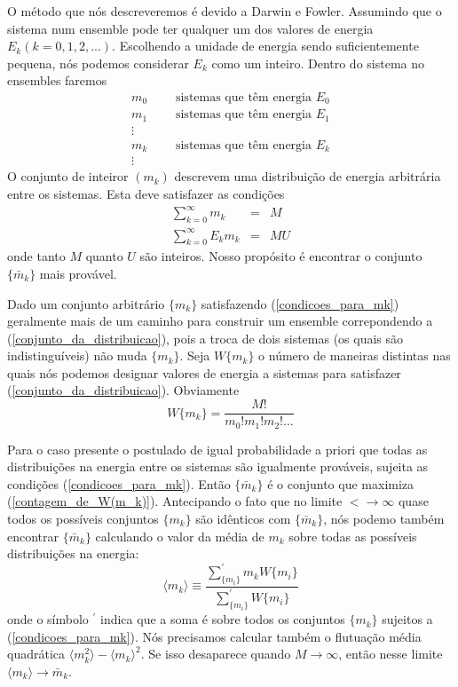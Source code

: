 O método que nós descreveremos é devido a Darwin e Fowler. Assumindo que o sistema num ensemble pode ter qualquer um dos valores de energia $E_{k}(k=0,1,2,...)$. Escolhendo a unidade de energia sendo suficientemente pequena, nós podemos considerar $E_{k}$ como um inteiro. Dentro do sistema no ensembles faremos 
\begin{eqnarray}
m_{0} &~~~& \text{sistemas que têm energia }E_{0} \nonumber \\
m_{1} &~~~& \text{sistemas que têm energia }E_{1} \nonumber \\
\vdots \label{conjunto_da_distribuicao} \\
m_{k} &~~~& \text{sistemas que têm energia }E_{k} \nonumber \\
\vdots \nonumber
\end{eqnarray}
O conjunto de inteiror $(m_{k})$ descrevem uma distribuição de energia arbitrária entre os sistemas. Esta deve satisfazer as condições
\begin{eqnarray}
\sum_{k=0}^{\infty}m_{k}&=&M \nonumber \\
\sum_{k=0}^{\infty}E_{k}m_{k}&=& MU
\label{condicoes_para_mk}
\end{eqnarray}
onde tanto $M$ quanto $U$ são inteiros. Nosso propósito é encontrar o conjunto $\{\bar{m}_{k}\}$ mais provável.

Dado um conjunto arbitrário $\{m_{k}\}$ satisfazendo (\ref{condicoes_para_mk}) geralmente mais de um caminho para construir um ensemble correpondendo a (\ref{conjunto_da_distribuicao}), pois a troca de dois sistemas (os quais são indistinguíveis) não muda $\{m_{k}\}$. Seja $W\{m_{k}\}$ o número de maneiras distintas nas quais nós podemos designar valores de energia a sistemas para satisfazer (\ref{conjunto_da_distribuicao}). Obviamente
\begin{equation}
W\{m_{k}\}=\frac{M!}{m_{0}!m_{1}!m_{2}!\dots}
\label{contagem_de_W(m_k)}
\end{equation}

Para o caso presente o postulado de igual probabilidade a priori que todas as distribuições na energia entre os sistemas são igualmente prováveis, sujeita as condições (\ref{condicoes_para_mk}). Então $\{\bar{m}_{k}\}$ é o conjunto que maximiza (\ref{contagem_de_W(m_k)}). Antecipando o fato que no limite $< \rightarrow \infty$ quase todos os possíveis conjuntos $\{m_{k}\}$ são idênticos com $\{\bar{m}_{k}\}$, nós podemo também encontrar $\{\bar{m}_{k}\}$ calculando o valor da média de $m_{k}$ sobre todas as possíveis distribuições na energia:
\begin{equation}
\langle m_{k}\rangle \equiv \frac{\sum_{\{m_{i}\}}^{\prime} m_{k}W\{m_{i}\}}{\sum_{\{m_{i}\}}^{\prime} W\{m_{i}\}}
\end{equation}
onde o símbolo $^{\prime}$ indica que a soma é sobre todos os conjuntos $\{m_{k}\}$ sujeitos a (\ref{condicoes_para_mk}). Nós precisamos calcular também o flutuação média quadrática $\langle m_{k}^{2}\rangle-\langle m_{k}\rangle^{2}$. Se isso desaparece quando $M \rightarrow \infty$, então nesse limite $\langle m_{k}\rangle \rightarrow \bar{m}_{k}$.

